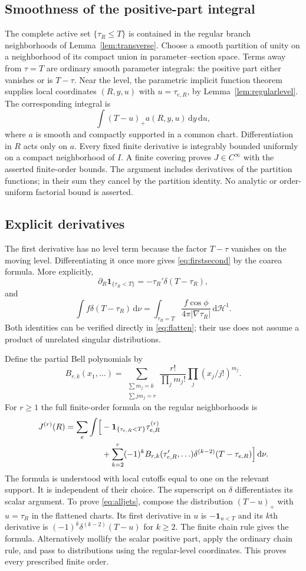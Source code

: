 \documentclass[11pt,reqno]{amsart}
\numberwithin{equation}{section}
\theoremstyle{remark}\newtheorem{remark}[theorem]{Remark}
\newcommand{\dd}{\,\mathrm d}\newcommand{\one}{\mathbf1}\newcommand{\T}{\mathbb T}
\begin{document}
\subsection{Smoothness of the positive-part integral}
The complete active set $\{\tau_R\le T\}$ is contained in the regular branch neighborhoods of Lemma~\ref{lem:transverse}. Choose a smooth partition of unity on a neighborhood of its compact union in parameter--section space. Terms away from $\tau=T$ are ordinary smooth parameter integrals: the positive part either vanishes or is $T-\tau$. Near the level, the parametric implicit function theorem supplies local coordinates $(R,y,u)$ with $u=\tau_{e,R}$, by Lemma~\ref{lem:regularlevel}. The corresponding integral is
\begin{equation}\label{eq:flatten}
 \int (T-u)_+a(R,y,u)\dd y\dd u,
\end{equation}
where $a$ is smooth and compactly supported in a common chart. Differentiation in $R$ acts only on $a$. Every fixed finite derivative is integrably bounded uniformly on a compact neighborhood of $I$. A finite covering proves $J\in C^\infty$ with the asserted finite-order bounds. The argument includes derivatives of the partition functions; in their sum they cancel by the partition identity. No analytic or order-uniform factorial bound is asserted.

\subsection{Explicit derivatives}
The first derivative has no level term because the factor $T-\tau$ vanishes on the moving level. Differentiating it once more gives \eqref{eq:firstsecond} by the coarea formula. More explicitly,
\[
 \partial_R\one_{\{\tau_R<T\}}=-\tau_R'\delta(T-\tau_R),
\]
and
\[
 \int f\delta(T-\tau_R)\dd\nu
 =\int_{\tau_R=T}\frac{f\cos\phi}{4\pi|\nabla\tau_R|}\dd\mathcal H^1.
\]
Both identities can be verified directly in \eqref{eq:flatten}; their use does not assume a product of unrelated singular distributions.

Define the partial Bell polynomials by
\[
 B_{r,k}(x_1,\ldots)=\sum_{\substack{\sum m_j=k\\\sum jm_j=r}}
 \frac{r!}{\prod_jm_j!}\prod_j(x_j/j!)^{m_j}.
\]
For $r\ge1$ the full finite-order formula on the regular neighborhoods is
\begin{align}\label{eq:alljets}
 J^{(r)}(R)=\sum_e\int\Bigl[&-\one_{\{\tau_{e,R}<T\}}\tau_{e,R}^{(r)}\\
 &+\sum_{k=2}^r(-1)^k B_{r,k}(\tau_{e,R}',\ldots)
 \delta^{(k-2)}(T-\tau_{e,R})\Bigr]\dd\nu.\notag
\end{align}
The formula is understood with local cutoffs equal to one on the relevant support. It is independent of their choice. The superscript on $\delta$ differentiates its scalar argument. To prove \eqref{eq:alljets}, compose the distribution $(T-u)_+$ with $u=\tau_R$ in the flattened charts. Its first derivative in $u$ is $-\one_{u<T}$ and its $k$th derivative is $(-1)^k\delta^{(k-2)}(T-u)$ for $k\ge2$. The finite chain rule gives the formula. Alternatively mollify the scalar positive part, apply the ordinary chain rule, and pass to distributions using the regular-level coordinates. This proves every prescribed finite order.
\end{document}

